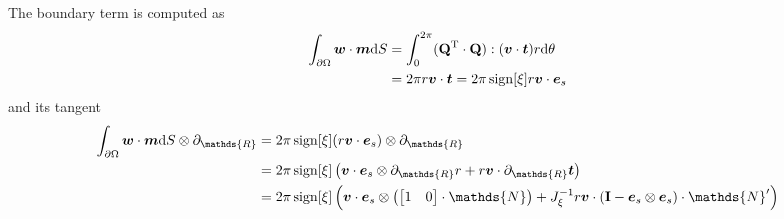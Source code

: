 \documentclass[a4paper,11pt]{article}
\renewcommand{\to}[1]{\text{\boldmath $#1$}} %
\newcommand{\ts}[1]{\text{\boldmath $\mathrm{#1}$}} %
\newcommand{\uv}[1]{\mathds{#1}}
\newcommand{\um}[1]{\mathds{#1}}
\newcommand{\intd}[1]{\mathrm{d}#1}
\newcommand{\pderiv}[2]{\partial_{#2} #1}
\newcommand{\T}{\mathrm{T}}
\DeclareMathOperator{\sign}{sign}
\begin{document}
The boundary term is computed as
\begin{align}
 \int_{\partial\Omega} \to w\cdot\to m\intd S &= \int_0^{2\pi} (\ts Q^\T\cdot \ts Q):(\to v\cdot\to t) r \intd \theta\\
  &= 2\pi r \to v \cdot \to t = 2\pi\sign[\xi]r \to v\cdot \to e_s
\end{align}
and its tangent
\begin{align}
 \int_{\partial\Omega} \to w\cdot\to m\intd S \otimes \pderiv{}{\uv R} &= 2\pi\sign[\xi] (r \to v \cdot \to e_s)\otimes \pderiv{}{\uv R}\\
  &= 2 \pi \sign[\xi]\left(\to v\cdot\to e_s\otimes\pderiv{r}{\uv R} + r \to v\cdot\pderiv{\to t}{\uv R}\right)\\
  &= 2 \pi \sign[\xi]\left(\to v\cdot\to e_s\otimes\left(\begin{bmatrix}1&0\end{bmatrix}\cdot\um N\right) +  J_\xi^{-1} r \to v\cdot\left(\ts I-\to e_s\otimes\to e_s\right)\cdot \um N'\right)
\end{align}
\end{document}
